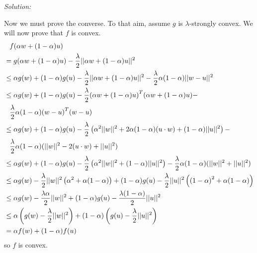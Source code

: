 \documentclass[
10pt, %
a4paper, %
oneside, %
headinclude,footinclude, %
BCOR5mm, %
]{scrartcl}
\newenvironment{solution}
               {\textit{Solution:}}
               {}
\begin{document}
\begin{solution}
\begin{enumerate}[label= (\alph*)]
        Now we must prove the converse. To that aim, assume $g$ is $\lambda$-strongly convex. We will now prove that $f$ is convex.
        \begin{align*}
          &\hphantom{=} f(\alpha w + (1-\alpha)u) \\
          &= g(\alpha w + (1-\alpha)u) - \frac{\lambda}{2}||\alpha w + (1-\alpha)u||^2 \\
          &\leq \alpha g(w) + (1-\alpha)g(u) - \frac{\lambda}{2}||\alpha w + (1-\alpha) u||^2 - \frac{\lambda}{2}\alpha(1-\alpha)||w-u||^2 \\
          &\leq \alpha g(w) + (1-\alpha)g(u) - \frac{\lambda}{2}{(\alpha w + (1-\alpha) u)}^T(\alpha w + (1-\alpha) u) - \\
          &\hphantom{\leq} \frac{\lambda}{2}\alpha(1-\alpha){(w-u)}^T(w-u) \\
          &\leq \alpha g(w) + (1-\alpha)g(u) - \frac{\lambda}{2}\left(\alpha^2 ||w||^2 + 2\alpha(1-\alpha)(u \cdot w) + (1-\alpha) ||u||^2\right) - \\
          &\hphantom{\leq} \frac{\lambda}{2}\alpha(1-\alpha)(||w||^2 - 2(u\cdot w) + ||u||^2) \\
          &\leq \alpha g(w) + (1-\alpha)g(u) - \frac{\lambda}{2}\left(\alpha^2 ||w||^2 + (1-\alpha) ||u||^2\right) - \frac{\lambda}{2}\alpha(1-\alpha)(||w||^2 + ||u||^2) \\
          &\leq \alpha g(w) - \frac{\lambda}{2}||w||^2\left(\alpha^2 + \alpha(1-\alpha) \right)  + (1-\alpha)g(u) - \frac{\lambda}{2}||u||^2\left({(1-\alpha)}^2 + \alpha(1-\alpha)\right) \\
          &\leq \alpha g(w) - \frac{\lambda\alpha}{2}||w||^2  + (1-\alpha)g(u) - \frac{\lambda(1-\alpha)}{2}||u||^2 \\
          &\leq \alpha \left(g(w) - \frac{\lambda}{2}||w||^2\right) + (1-\alpha)\left(g(u) - \frac{\lambda}{2}||u||^2\right) \\
          &= \alpha f(w) + (1-\alpha)f(u)
        \end{align*}
        so $f$ is convex.
  \end{enumerate}
\end{solution}
\end{document}
